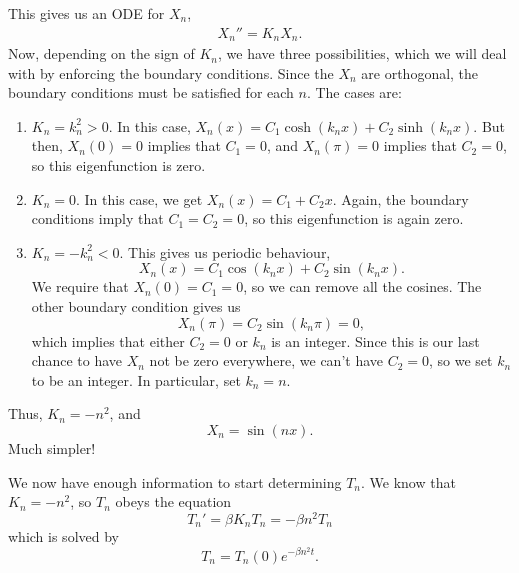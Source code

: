 \documentclass[10pt,driverfallback=hypertex]{report}
\begin{document}
This gives us an ODE for $X_n$,
\begin{eqnarray}
  \label{Eigenfunction}
  \boxed{X_n'' = K_n X_n.}
\end{eqnarray}
Now, depending on the sign of $K_n$, we have three possibilities, which we will
deal with by enforcing the boundary conditions. Since the $X_n$ are orthogonal,
the boundary conditions must be satisfied for each $n$. The cases are:
\begin{enumerate}
  \item $K_n=k_n^2 > 0$. In this case, $X_n(x)= C_1 \cosh(k_n x) +C_2
    \sinh(k_n x)$.  But then, $X_n(0)=0$ implies that $C_1=0$, and
    $X_n(\pi)=0$ implies that $C_2=0$, so this eigenfunction is zero.
  \item $K_n = 0$. In this case, we get $X_n(x)=C_1 +C_2 x$. Again,
    the boundary conditions imply that $C_1=C_2=0$, so this
    eigenfunction is again zero.
  \item $K_n =-k_n^2 < 0$. This gives us periodic behaviour,
    \begin{dmath*}
      X_n(x)=C_1\cos(k_nx) + C_2\sin(k_nx).
    \end{dmath*}
    We require that $X_n(0)=C_1=0$, so we can remove all the cosines. The
    other boundary condition gives us
    \begin{dmath*}[compact]
      X_n(\pi)=C_2\sin(k_n\pi)=0,
    \end{dmath*}
    which implies that either $C_2=0$ or $k_n$ is an integer. Since this is
    our last chance to have $X_n$ not be zero everywhere, we can't have $C_2=0$,
    so we set $k_n$ to be an integer. In particular, set $k_n=n$.
\end{enumerate}
Thus, $K_n=-n^2$, and 
\begin{dmath*}
  \boxed{X_n= \sin(nx).}
\end{dmath*}
Much simpler!

We now have enough information to start determining $T_n$. We know that
$K_n=-n^2$, so $T_n$ obeys the equation
\begin{dmath*}[compact]
  T_n' = \beta K_n T_n = - \beta n^2 T_n
\end{dmath*}
which is solved by
\begin{dmath*}[compact]
  \boxed{T_n = T_n(0) e^{-\beta n^2 t}.}
\end{dmath*}
\end{document}
